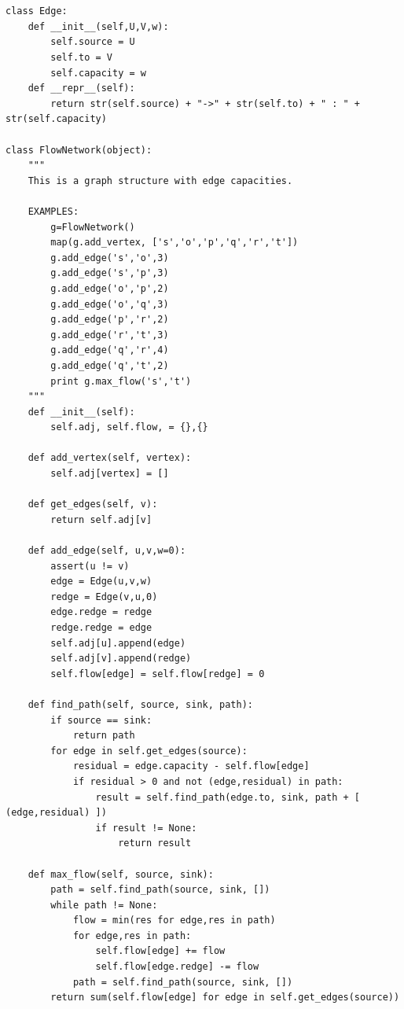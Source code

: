 %
\begin{center}
\fontsize{9pt}{9pt}
\selectfont
\tt
\begin{lstlisting}

class Edge:
    def __init__(self,U,V,w):
        self.source = U
        self.to = V
        self.capacity = w
    def __repr__(self):
        return str(self.source) + "->" + str(self.to) + " : " + str(self.capacity)
 
class FlowNetwork(object):
    """
    This is a graph structure with edge capacities.

    EXAMPLES:
        g=FlowNetwork()
        map(g.add_vertex, ['s','o','p','q','r','t'])
        g.add_edge('s','o',3)
        g.add_edge('s','p',3)
        g.add_edge('o','p',2)
        g.add_edge('o','q',3)
        g.add_edge('p','r',2)
        g.add_edge('r','t',3)
        g.add_edge('q','r',4)
        g.add_edge('q','t',2)
        print g.max_flow('s','t')
    """
    def __init__(self):
        self.adj, self.flow, = {},{}
 
    def add_vertex(self, vertex):
        self.adj[vertex] = []
 
    def get_edges(self, v):
        return self.adj[v]
 
    def add_edge(self, u,v,w=0):
        assert(u != v)
        edge = Edge(u,v,w)
        redge = Edge(v,u,0)
        edge.redge = redge
        redge.redge = edge
        self.adj[u].append(edge)
        self.adj[v].append(redge)
        self.flow[edge] = self.flow[redge] = 0
 
    def find_path(self, source, sink, path):
        if source == sink:
            return path
        for edge in self.get_edges(source):
            residual = edge.capacity - self.flow[edge]
            if residual > 0 and not (edge,residual) in path:
                result = self.find_path(edge.to, sink, path + [ (edge,residual) ]) 
                if result != None:
                    return result
 
    def max_flow(self, source, sink):
        path = self.find_path(source, sink, [])
        while path != None:
            flow = min(res for edge,res in path)
            for edge,res in path:
                self.flow[edge] += flow
                self.flow[edge.redge] -= flow
            path = self.find_path(source, sink, [])
        return sum(self.flow[edge] for edge in self.get_edges(source))

\end{lstlisting}
\end{center}
%

